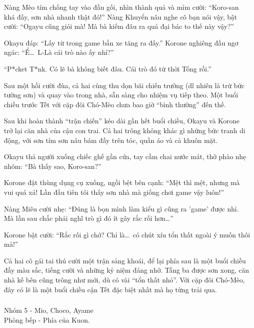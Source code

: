 \documentclass[../main.tex]{subfiles}
\begin{document}
Nàng Mèo tím chống tay vào đầu gối, nhìn thành quả và mỉm cười: ``Koro-san khá đấy, sơn nhà nhanh thật đó!'' Nàng Khuyển nâu nghe cô bạn nói vậy, bật cười: ``Ogayu cũng giỏi mà! Mà bà kiếm đâu ra quả đại bác to thế này vậy?''

Okayu đáp: ``Lấy từ trong game bắn xe tăng ra đấy.'' Korone nghiêng đầu ngơ ngác: ``Ể\dots\ L-Là cái trò nào ấy nhỉ?''

``P*cket T*nk. Có lẽ bà không biết đâu. Cái trò đó từ thời Tống rồi.''

Sau một hồi cười đùa, cả hai cùng thu dọn bãi chiến trường (dĩ nhiên là trừ bức tường sơn) và quay vào trong nhà, sẵn sàng cho nhiệm vụ tiếp theo. Một buổi chiều trước Tết với cặp đôi Chó-Mèo chưa bao giờ ``bình thường'' đến thế.

Sau khi hoàn thành ``trận chiến'' kéo dài gần hết buổi chiều, Okayu và Korone trở lại căn nhà của cậu con trai. Cả hai trông không khác gì những bức tranh di động, với sơn tím sơn nâu bám đầy trên tóc, quần áo và cả khuôn mặt.

Okayu thả người xuống chiếc ghế gần cửa, tay cầm chai nước mát, thở phào nhẹ nhõm: ``Bà thấy sao, Koro-san?''

Korone đặt thùng dụng cụ xuống, ngồi bệt bên cạnh: ``Mệt thì mệt, nhưng mà vui quá xá! Lần đầu tiên tôi thấy sơn nhà mà giống chơi game vậy luôn!''

Nàng Miêu cười nhẹ: ``Đúng là bọn mình làm kiểu gì cũng ra 'game' được nhỉ. Mà lần sau chắc phải nghĩ trò gì đó ít gây rắc rối hơn\dots''

Korone bật cười: ``Rắc rối gì chớ? Chỉ là\dots\ có chút xíu tổn thất ngoài ý muốn thôi mà!''

Cả hai cô gái tai thú cười một trận sảng khoái, để lại phía sau là một buổi chiều đầy màu sắc, tiếng cười và những kỷ niệm đáng nhớ. Tầng ba được sơn xong, căn nhà kế bên cũng trông như mới, dù có vài ``tổn thất nhỏ''. Với cặp đôi Chó-Mèo, đây có lẽ là một buổi chiều cận Tết đặc biệt nhất mà họ từng trải qua.

\vspace{-40pt} \subsubsection*{\label{ep-003.IVe}} 

\begin{center}
    {\color{T5} Nhóm 5 - Mio, Choco, Ayame}\\Phòng bếp - Phía của Kuon.
\end{center}
\end{document}
